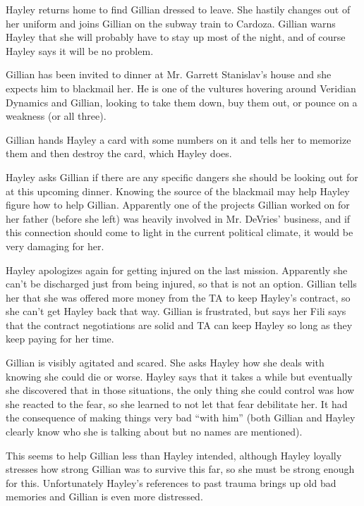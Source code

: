 
Hayley returns home to find Gillian dressed to leave.  She hastily changes out of her uniform and joins Gillian on the subway train to Cardoza. Gillian warns Hayley that she will probably have to stay up most of the night, and of course Hayley says it will be no problem.



Gillian has been invited to dinner at Mr. Garrett Stanislav's house and she expects him to blackmail her.  He is one of the vultures hovering around Veridian Dynamics and Gillian, looking to take them down, buy them out, or pounce on a weakness (or all three).



Gillian hands Hayley a card with some numbers on it and tells her to memorize them and then destroy the card, which Hayley does.



Hayley asks Gillian if there are any specific dangers she should be looking out for at this upcoming dinner.  Knowing the source of the blackmail may help Hayley figure how to help Gillian.  Apparently one of the projects Gillian worked on for her father (before she left) was heavily involved in Mr. DeVries' business, and if this connection should come to light in the current political climate, it would be very damaging for her.



Hayley apologizes again for getting injured on the last mission.  Apparently she can't be discharged just from being injured, so that is not an option.  Gillian tells her that she was offered more money from the TA to keep Hayley's contract, so she can't get Hayley back that way.  Gillian is frustrated, but says her Fili says that the contract negotiations are solid and TA can keep Hayley so long as they keep paying for her time. 



Gillian is visibly agitated and scared. She asks Hayley how she deals with knowing she could die or worse.  Hayley says that it takes a while but eventually she discovered that in those situations, the only thing she could control was how she reacted to the fear, so she learned to not let that fear debilitate her.  It had the consequence of making things very bad ``with him'' (both Gillian and Hayley clearly know who she is talking about but no names are mentioned).



This seems to help Gillian less than Hayley intended, although Hayley loyally stresses how strong Gillian was to survive this far, so she must be strong enough for this.  Unfortunately Hayley's references to past trauma brings up old bad memories and Gillian is even more distressed.  



